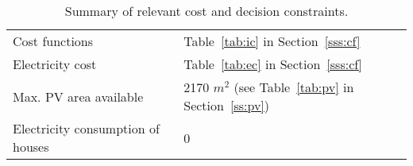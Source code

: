 \begin{table}[htp]
	\centering
	\caption{Summary of relevant cost and decision constraints.}
	\label{tab:cc_cu}
	\begin{tabular}{ll}
		\toprule
		Cost functions         & Table~\ref{tab:ic} in Section~\ref{sss:cf}         \\
		Electricity cost       & Table~\ref{tab:ec} in Section~\ref{sss:cf}       \\
		Max. PV area available & 2170 $m^2$ (see Table~\ref{tab:pv} in Section~\ref{ss:pv})\\
		Electricity consumption of houses	 & 0 \\ 
		\bottomrule
	\end{tabular}
\end{table}